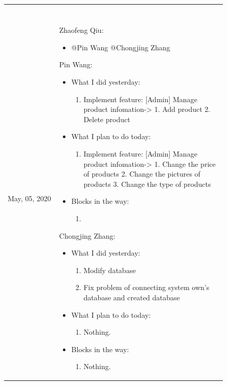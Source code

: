\documentclass{report}
\begin{document}
\begin{tabularx}{0.95\linewidth}{%
  >{\raggedright\arraybackslash}p{0.2\linewidth}%
  >{\raggedright\arraybackslash}p{0.65\linewidth}}
\begin{itemize}
\begin{enumerate}
      \end{enumerate}
  \end{itemize}
  \\
  \\
  \midrule
  May, 05, 2020
  & 
  Zhaofeng Qiu:
  \begin{itemize}
    \item @Pin Wang @Chongjing Zhang 
  \end{itemize}
  Pin Wang:
  \begin{itemize}
    \item What I did yesterday: 
    \begin{enumerate}
      \item Implement feature: [Admin] Manage product infomation-> 1. Add product 2. Delete product
    \end{enumerate}
    \item What I plan to do today: 
    \begin{enumerate}
      \item Implement feature: [Admin] Manage product infomation-> 1. Change the price of products 2. Change the pictures of products 3. Change the type of products
    \end{enumerate}
    \item Blocks in the way: 
    \begin{enumerate}
      \item 
    \end{enumerate}
  \end{itemize}
  Chongjing Zhang:
  \begin{itemize}
    \item What I did yesterday: 
    \begin{enumerate}
      \item Modify database 
      \item Fix problem of connecting system own's database and created database
    \end{enumerate}
    \item What I plan to do today:
      \begin{enumerate}
        \item Nothing.
      \end{enumerate}
    \item Blocks in the way: 
      \begin{enumerate}
        \item Nothing.
      \end{enumerate}

\end{itemize}
\end{tabularx}
\end{document}
